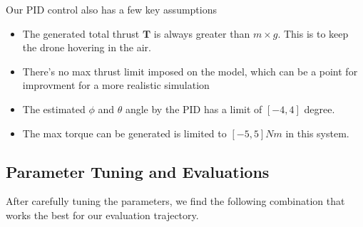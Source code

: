 \documentclass[12pt]{article}
\begin{document}
\noindent Our PID control also has a few key assumptions
\begin{itemize}
    \item The generated total thrust $\mathbf{T}$ is always greater than $m \times g$. This is to keep the drone hovering in the air.
    \item There's no max thrust limit imposed on the model, which can be a point for improvment for a more realistic simulation
    \item The estimated $\phi$ and $\theta$ angle by the PID has a limit of $[-4, 4]$ degree.
    \item The max torque can be generated is limited to $[-5, 5] Nm$ in this system.
\end{itemize}

\subsection{Parameter Tuning and Evaluations}

After carefully tuning the parameters, we find the following combination that works the best for our evaluation trajectory.
\end{document}
